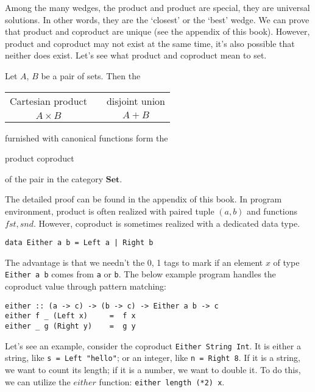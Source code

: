 \documentclass{article}
\begin{document}
Among the many wedges, the product and product are special, they are universal solutions. In other words, they are the `closest' or the `best' wedge. We can prove that product and coproduct are unique (see the appendix of this book). However, product and coproduct may not exist at the same time, it's also possible that neither does exist. Let's see what product and coproduct mean to set.

\begin{lemma}
Let $A$, $B$ be a pair of sets. Then the

\begin{center}
\begin{tabular}{ccc}
Cartesian product & \quad \quad \quad & disjoint union \\
$A \times B$ & \quad \quad \quad & $A + B$ \\
\end{tabular}
\end{center}

furnished with canonical functions form the

\begin{center}
product \quad \quad \quad coproduct
\end{center}

of the pair in the category $\pmb{Set}$.
\end{lemma}

The detailed proof can be found in the appendix of this book. In program environment, product is often realized with paired tuple $(a, b)$ and functions $fst, snd$. However, coproduct is sometimes realized with a dedicated data type.

\lstset{frame = single}
\begin{lstlisting}
data Either a b = Left a | Right b
\end{lstlisting}

The advantage is that we needn't the 0, 1 tags to mark if an element $x$ of type \texttt{Either a b} comes from \texttt{a} or \texttt{b}. The below example program handles the coproduct value through pattern matching:

\begin{lstlisting}
either :: (a -> c) -> (b -> c) -> Either a b -> c
either f _ (Left x)     =  f x
either _ g (Right y)    =  g y
\end{lstlisting}
\lstset{frame = none}

Let's see an example, consider the coproduct \texttt{Either String Int}. It is either a string, like \texttt{s = Left "hello"}; or an integer, like \texttt{n = Right 8}. If it is a string, we want to count its length; if it is a number, we want to double it. To do this, we can utilize the $either$ function: \texttt{either length (*2) x}.
\end{document}
